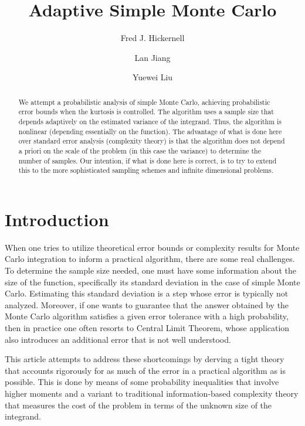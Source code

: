 \documentclass[12pt]{amsart}
\begin{document}
\title{Adaptive Simple Monte Carlo}
\author{Fred J. Hickernell}
\author{Lan Jiang}
\author{Yuewei Liu}
\address{Room E1-208, Department of Applied Mathematics, Illinois Institute of Technology, 10 W.\ 32$^{\text{nd}}$ St., Chicago, IL 60616}
\address{Room E1-208, Department of Applied Mathematics, Illinois Institute of Technology, 10 W.\ 32$^{\text{nd}}$ St., Chicago, IL 60616}
\address{School of Mathematics and Statistics, Lanzhou University, Lanzhou City, Gansu, China 730000}
\begin{abstract}We attempt a probabilistic analysis of simple Monte Carlo, achieving probabilistic error bounds when the kurtosis is controlled.  The algorithm uses a sample size that depends adaptively on the estimated variance of the integrand.  Thus, the algorithm is nonlinear (depending essentially on the function).  The advantage of what is done here over standard error analysis (complexity theory) is that the algorithm does not depend a priori on the scale of the problem (in this case the variance) to determine the number of samples.   Our intention, if what is done here is correct, is to try to extend this to the more sophisticated sampling schemes and infinite dimensional problems.
\end{abstract}
\maketitle


\section{Introduction}

When one tries to utilize theoretical error bounds or complexity results for Monte Carlo integration to inform a practical algorithm, there are some real challenges.  To determine the sample size needed, one must have some information about the size of the function, specifically its standard deviation in the case of simple Monte Carlo.  Estimating this standard deviation is a step whose error is typically not analyzed.  Moreover, if one wants to guarantee that the answer obtained by the Monte Carlo algorithm satisfies a given error tolerance with a high probability, then in practice one often resorts to Central Limit Theorem, whose application also introduces an additional error that is not well understood.  

This article attempts to address these shortcomings by derving a tight theory that accounts rigorously for as much of the error in a practical algorithm as is possible.  This is done by means of some probability inequalities that involve higher moments and a variant to traditional information-based complexity theory that measures the cost of the problem in terms of the unknown size of the integrand.  
\end{document}
